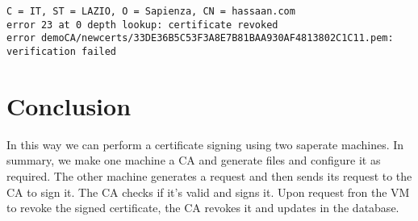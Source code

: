 \documentclass[11pt]{article}
\begin{document}
\begin{verbatim}
C = IT, ST = LAZIO, O = Sapienza, CN = hassaan.com
error 23 at 0 depth lookup: certificate revoked
error demoCA/newcerts/33DE36B5C53F3A8E7B81BAA930AF4813802C1C11.pem: verification failed

\end{verbatim}

\section{Conclusion}
In this way we can perform a certificate signing using two saperate machines. In summary, we make one machine a CA and generate files and configure it as required. The other machine generates a request and then sends its request to the CA to sign it. The CA checks if it's valid and signs it. Upon request fron the VM to revoke the signed certificate, the CA revokes it and updates in the database.
\end{document}
